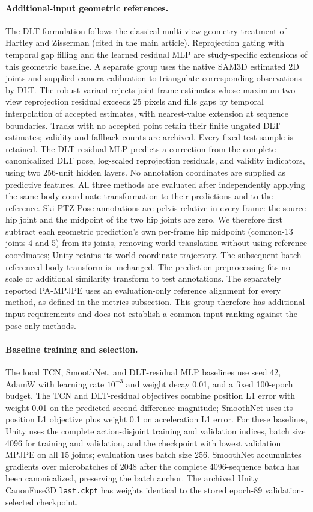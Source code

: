 \documentclass[11pt,letterpaper]{article}
\begin{document}
\paragraph{Additional-input geometric references.}
The DLT formulation follows the classical multi-view geometry treatment of Hartley and Zisserman (cited in the main article). Reprojection gating with temporal gap filling and the learned residual MLP are study-specific extensions of this geometric baseline.
A separate group uses the native SAM3D estimated 2D joints and supplied camera calibration to triangulate corresponding observations by DLT. The robust variant rejects joint-frame estimates whose maximum two-view reprojection residual exceeds 25 pixels and fills gaps by temporal interpolation of accepted estimates, with nearest-value extension at sequence boundaries. Tracks with no accepted point retain their finite ungated DLT estimates; validity and fallback counts are archived. Every fixed test sample is retained. The DLT-residual MLP predicts a correction from the complete canonicalized DLT pose, log-scaled reprojection residuals, and validity indicators, using two 256-unit hidden layers. No annotation coordinates are supplied as predictive features. All three methods are evaluated after independently applying the same body-coordinate transformation to their predictions and to the reference. Ski-PTZ-Pose annotations are pelvis-relative in every frame: the source hip joint and the midpoint of the two hip joints are zero. We therefore first subtract each geometric prediction's own per-frame hip midpoint (common-13 joints 4 and 5) from its joints, removing world translation without using reference coordinates; Unity retains its world-coordinate trajectory. The subsequent batch-referenced body transform is unchanged. The prediction preprocessing fits no scale or additional similarity transform to test annotations. The separately reported PA-MPJPE uses an evaluation-only reference alignment for every method, as defined in the metrics subsection. This group therefore has additional input requirements and does not establish a common-input ranking against the pose-only methods.

\paragraph{Baseline training and selection.}
The local TCN, SmoothNet, and DLT-residual MLP baselines use seed 42, AdamW with learning rate $10^{-3}$ and weight decay 0.01, and a fixed 100-epoch budget. The TCN and DLT-residual objectives combine position L1 error with weight 0.01 on the predicted second-difference magnitude; SmoothNet uses its position L1 objective plus weight 0.1 on acceleration L1 error. For these baselines, Unity uses the complete action-disjoint training and validation indices, batch size 4096 for training and validation, and the checkpoint with lowest validation MPJPE on all 15 joints; evaluation uses batch size 256. SmoothNet accumulates gradients over microbatches of 2048 after the complete 4096-sequence batch has been canonicalized, preserving the batch anchor. The archived Unity CanonFuse3D \texttt{last.ckpt} has weights identical to the stored epoch-89 validation-selected checkpoint.
\end{document}
